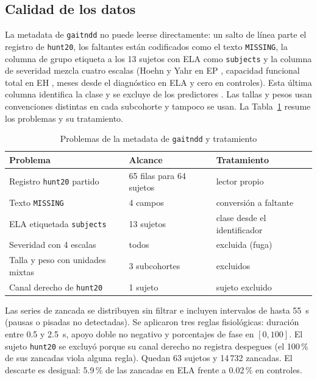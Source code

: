 \documentclass[conference]{IEEEtran}
\newcommand{\gaitndd}{\texttt{gaitndd}}
\begin{document}
\subsection{Calidad de los datos}
La metadata de \gaitndd{} no puede leerse directamente: un salto de línea parte el registro de \texttt{hunt20}, los faltantes están codificados como el texto \texttt{MISSING}, la columna de grupo etiqueta a los 13 sujetos con ELA como \texttt{subjects} y la columna de severidad mezcla cuatro escalas (Hoehn y Yahr en EP \cite{hoehn1967}, capacidad funcional total en EH \cite{shoulson1979}, meses desde el diagnóstico en ELA y cero en controles). Esta última columna identifica la clase y se excluye de los predictores \cite{kaufman2012}. Las tallas y pesos usan convenciones distintas en cada subcohorte y tampoco se usan. La Tabla~\ref{tab:metadata} resume los problemas y su tratamiento.

\begin{table}[t]
\caption{Problemas de la metadata de \gaitndd{} y tratamiento}
\label{tab:metadata}
\centering
\footnotesize
\begin{tabular}{@{}p{}p{}p{}@{}}
\toprule
Problema & Alcance & Tratamiento \\
\midrule
Registro \texttt{hunt20} partido & 65 filas para 64 sujetos & lector propio \\
Texto \texttt{MISSING} & 4 campos & conversión a faltante \\
ELA etiquetada \texttt{subjects} & 13 sujetos & clase desde el identificador \\
Severidad con 4 escalas & todos & excluida (fuga) \\
Talla y peso con unidades mixtas & 3 subcohortes & excluidos \\
Canal derecho de \texttt{hunt20} & 1 sujeto & sujeto excluido \\
\bottomrule
\end{tabular}
\end{table}

Las series de zancada se distribuyen sin filtrar e incluyen intervalos de hasta 55~s (pausas o pisadas no detectadas). Se aplicaron tres reglas fisiológicas: duración entre 0.5 y 2.5~s, apoyo doble no negativo y porcentajes de fase en $[0, 100]$. El sujeto \texttt{hunt20} se excluyó porque su canal derecho no registra despegues (el 100\,\% de sus zancadas viola alguna regla). Quedan 63 sujetos y 14\,732 zancadas. El descarte es desigual: 5.9\,\% de las zancadas en ELA frente a 0.02\,\% en controles.
\end{document}

